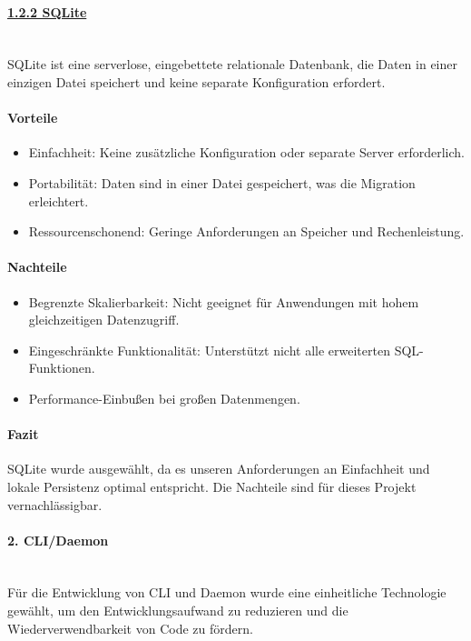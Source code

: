 \documentclass[a4paper,12pt]{report}
\begin{document}
    \paragraph*{\underline{1.2.2 SQLite}}\mbox{}\\
    SQLite ist eine serverlose, eingebettete relationale Datenbank, die Daten in einer einzigen Datei speichert und keine separate Konfiguration erfordert.

    \paragraph*{Vorteile}
    \begin{itemize}
        \item Einfachheit: Keine zusätzliche Konfiguration oder separate Server erforderlich.
        \item Portabilität: Daten sind in einer Datei gespeichert, was die Migration erleichtert.
        \item Ressourcenschonend: Geringe Anforderungen an Speicher und Rechenleistung.
    \end{itemize}

    \paragraph*{Nachteile}
    \begin{itemize}
        \item Begrenzte Skalierbarkeit: Nicht geeignet für Anwendungen mit hohem gleichzeitigen Datenzugriff.
        \item Eingeschränkte Funktionalität: Unterstützt nicht alle erweiterten SQL-Funktionen.
        \item Performance-Einbußen bei großen Datenmengen.
    \end{itemize}

    \paragraph*{Fazit}
    SQLite wurde ausgewählt, da es unseren Anforderungen an Einfachheit und lokale Persistenz optimal entspricht.
    Die Nachteile sind für dieses Projekt vernachlässigbar.

    \paragraph*{2. CLI/Daemon}\mbox{}\\
    Für die Entwicklung von CLI und Daemon wurde eine einheitliche Technologie gewählt, um den Entwicklungsaufwand zu reduzieren und die Wiederverwendbarkeit von Code zu fördern.
\end{document}
